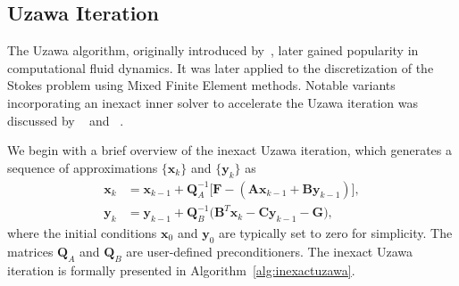 \subsection{Uzawa Iteration}
The Uzawa algorithm, originally introduced by~\cite{uzawa_arrow_hurwicz},
later gained popularity in computational fluid dynamics.
It was later applied to the discretization of the Stokes problem using
Mixed Finite Element methods. Notable variants incorporating an inexact inner solver to accelerate the Uzawa iteration
was discussed by
~\cite{InexactUzawa_Elam_Golub} and ~\cite{AnalysisInexactUzawa_Bramble_Pasciak_Vassilev}.

We begin with a brief overview of the inexact Uzawa iteration, which generates a sequence of approximations $\{\mathbf{x}_k\}$ 
and $\{\mathbf{y}_k\}$ as
\begin{equation}\label{eq:uzawasystem}
		  \begin{aligned}
					 \mathbf{x}_k &= \mathbf{x}_{k-1} + \mathbf{Q}_A^{-1} \big[\mathbf{F} - (\mathbf{A}\mathbf{x}_{k-1} + \mathbf{B}\mathbf{y}_{k-1})\big],\\
					 \mathbf{y}_k &= \mathbf{y}_{k-1} + \mathbf{Q}_B^{-1}\big(\mathbf{B}^T\mathbf{x}_{k} - \mathbf{C}\mathbf{y}_{k-1} -\mathbf{G}\big),
		  \end{aligned}
\end{equation}
where the initial conditions $\mathbf{x}_0$ and $\mathbf{y}_0$ are typically set to zero for simplicity. 
The matrices $\mathbf{Q}_A$ and $\mathbf{Q}_B$
are user-defined preconditioners. The inexact Uzawa iteration is formally presented in Algorithm~\ref{alg:inexactuzawa}.

